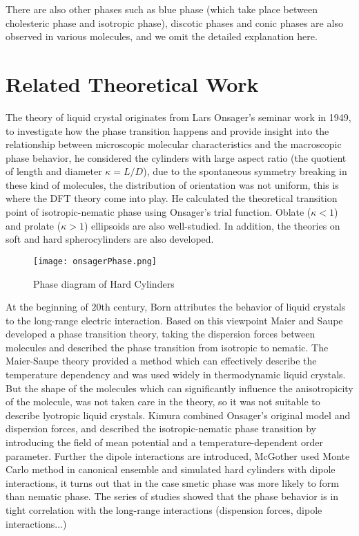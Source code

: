 There are also other phases such as blue phase (which take place between cholesteric phase and isotropic phase), discotic phases and conic phases are also observed in various molecules, and we omit the detailed explanation here.

\section{Related Theoretical Work}

The theory of liquid crystal originates from Lars Onsager's seminar work\cite{Onsager1949NYAS} in 1949, to investigate how the phase transition happens and provide insight into the relationship between microscopic molecular characteristics and the macroscopic phase behavior, he considered the cylinders with large aspect ratio (the quotient of length and diameter $\kappa=L/D$), due to the spontaneous symmetry breaking in these kind of molecules, the distribution of orientation was not uniform, this is where the DFT theory come into play. He calculated the theoretical transition point of isotropic-nematic phase using Onsager's trial function. Oblate ($\kappa<1$) and prolate ($\kappa>1$) ellipsoids are also well-studied. In addition, the theories on soft\cite{Wu2014MM} and hard spherocylinders\cite{Jackson1996JCP} are also developed.

\begin{figure}[H]
 	\centering
 	\texttt{[image: onsagerPhase.png]}
	\caption[Phase Diagram of Hard Cylinders]{Phase diagram of Hard Cylinders\cite{Capit2008Phase}}
	\label{fig:fch}
\end{figure}

At the beginning of $20$th century, Born attributes the behavior of liquid crystals to the long-range electric interaction. Based on this viewpoint Maier and Saupe developed a phase transition theory, taking the dispersion forces between molecules and described the phase transition from isotropic to nematic. The Maier-Saupe theory provided a method which can effectively describe the temperature dependency and was used widely in thermodynamic liquid crystals. But the shape of the molecules which can significantly influence the anisotropicity of the molecule, was not taken care in the theory, so it was not suitable to describe lyotropic liquid crystals. Kimura combined Onsager's original model and dispersion forces, and described the isotropic-nematic phase transition by introducing the field of mean potential and a temperature-dependent order parameter. Further the dipole interactions are introduced, McGother used Monte Carlo method in canonical ensemble and simulated hard cylinders with dipole interactions, it turns out that in the case smetic phase was more likely to form than nematic phase. The series of studies showed that the phase behavior is in tight correlation with the long-range interactions (dispension forces, dipole interactions...)

